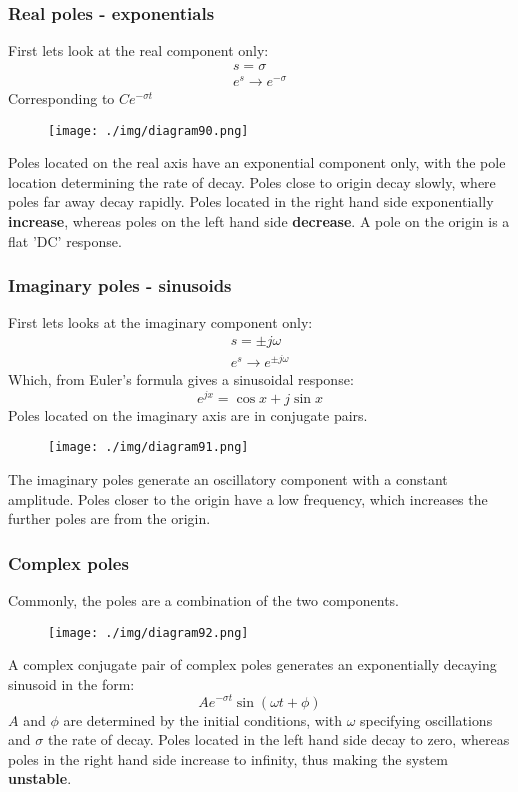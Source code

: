 \subsubsection{Real poles - exponentials}
First lets look at the real component only:
\begin{gather}
  s = \sigma\\
  e^s \rightarrow e^{-\sigma}
\end{gather}
Corresponding to $Ce^{-\sigma t}$
\begin{figure}[H]
  \centering
  \texttt{[image: ./img/diagram90.png]}
  \caption{}
\end{figure}
Poles located on the real axis have an exponential component only, with the pole location determining the rate of decay. Poles close to origin decay slowly, where poles far away decay rapidly. Poles located in the right hand side exponentially \textbf{increase}, whereas poles on the left hand side \textbf{decrease}. A pole on the origin is a flat 'DC' response.
\subsubsection{Imaginary poles - sinusoids}
First lets looks at the imaginary component only:
\begin{gather}
  s = \pm j\omega\\
  e^s \rightarrow e^{\pm j\omega}
\end{gather}
Which, from Euler's formula gives a sinusoidal response:
\begin{equation}
  e^{jx} = \cos{x} + j\sin{x}
\end{equation}
Poles located on the imaginary axis are in conjugate pairs.
\begin{figure}[H]
  \centering
  \texttt{[image: ./img/diagram91.png]}
  \caption{}
\end{figure}
The imaginary poles generate an oscillatory component with a constant amplitude. Poles closer to the origin have a low frequency, which increases the further poles are from the origin.
\subsubsection{Complex poles}
Commonly, the poles are a combination of the two components.
\begin{figure}[H]
  \centering
  \texttt{[image: ./img/diagram92.png]}
  \caption{}
\end{figure}
A complex conjugate pair of complex poles generates an exponentially decaying sinusoid in the form:
\begin{equation}
  Ae^{-\sigma t}\sin{\left(\omega t + \phi\right)}
\end{equation}
$A$ and $\phi$ are determined by the initial conditions, with $\omega$ specifying oscillations and $\sigma$ the rate of decay. Poles located in the left hand side decay to zero, whereas poles in the right hand side increase to infinity, thus making the system \textbf{unstable}.
